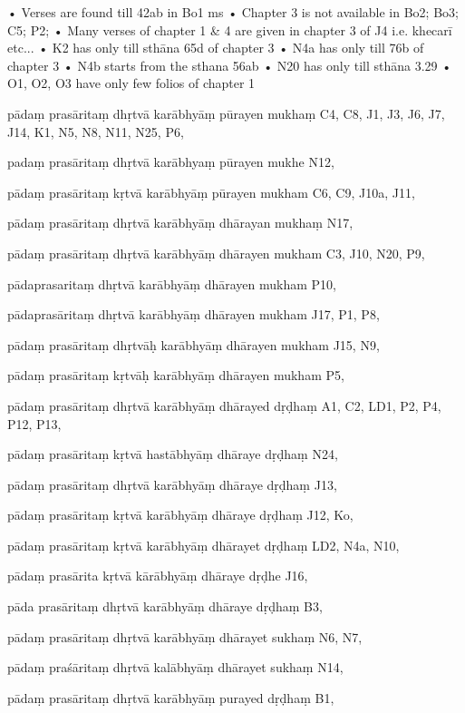     • Verses are found till 42ab in Bo1 ms
    • Chapter 3 is not available in Bo2; Bo3; C5; P2;
    • Many verses of chapter 1 & 4 are given in chapter 3 of J4 i.e. khecarī etc...
    • K2 has only till sthāna 65d of chapter 3
    • N4a has only till 76b of chapter 3
    • N4b starts from the sthana 56ab
    • N20 has only till sthāna 3.29
    • O1, O2, O3 have only few folios of chapter 1
\begin{marma}[hp03_010]


\item[pādaṃ prasāritaṃ dhṛtvā karābhyāṃ pūrayen mukhaṃ] C4, C8, J1, J3, J6, J7, J14, K1, N5, N8, N11, N25, P6, 
\item[padaṃ prasāritaṃ dhṛtvā karābhyaṃ pūrayen mukhe] N12,
\item[pādaṃ prasāritaṃ kṛtvā karābhyāṃ pūrayen mukham] C6, C9, J10a, J11,
\item[pādaṃ prasāritaṃ dhṛtvā karābhyāṃ dhārayan mukhaṃ] N17,
\item[pādaṃ prasāritaṃ dhṛtvā karābhyāṃ dhārayen mukham] C3, J10, N20, P9, 
\item[pādaprasaritaṃ dhṛtvā karābhyāṃ dhārayen mukham] P10,
\item[pādaprasāritaṃ dhṛtvā karābhyāṃ dhārayen mukham] J17, P1, P8, 
\item[pādaṃ prasāritaṃ dhṛtvāḥ karābhyāṃ dhārayen mukham] J15, N9, 
\item[pādaṃ prasāritaṃ kṛtvāḥ karābhyāṃ dhārayen mukham] P5,
\item[pādaṃ prasāritaṃ dhṛtvā karābhyāṃ dhārayed dṛḍhaṃ] A1, C2, LD1, P2, P4, P12, P13, 
\item[pādaṃ prasāritaṃ kṛtvā hastābhyāṃ dhāraye dṛḍhaṃ] N24,
\item[pādaṃ prasāritaṃ dhṛtvā karābhyāṃ dhāraye dṛḍhaṃ] J13,
\item[pādaṃ prasāritaṃ kṛtvā karābhyāṃ dhāraye dṛḍhaṃ] J12, Ko, 
\item[pādaṃ prasāritaṃ kṛtvā karābhyāṃ dhārayet dṛḍhaṃ] LD2, N4a, N10,
\item[pādaṃ prasārita kṛtvā kārābhyāṃ dhāraye dṛḍhe] J16,
\item[pāda prasāritaṃ dhṛtvā karābhyāṃ dhāraye dṛḍhaṃ] B3,
\item[pādaṃ prasāritaṃ dhṛtvā karābhyāṃ dhārayet sukhaṃ] N6, N7, 
\item[pādaṃ praśāritaṃ dhṛtvā kalābhyāṃ dhārayet sukhaṃ] N14,
\item[pādaṃ prasāritaṃ dhṛtvā karābhyāṃ purayed dṛḍhaṃ] B1, 

\end{marma}
